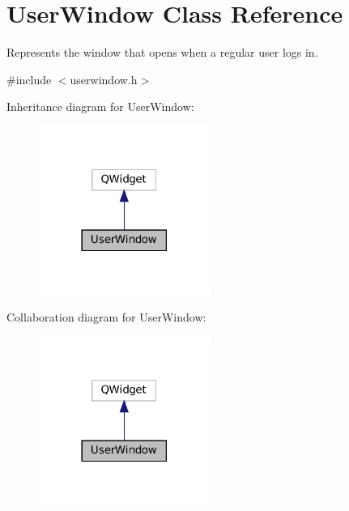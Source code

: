 \hypertarget{classUserWindow}{}\section{User\+Window Class Reference}
\label{classUserWindow}


Represents the window that opens when a regular user logs in.  




{\ttfamily \#include $<$userwindow.\+h$>$}



Inheritance diagram for User\+Window\+:\nopagebreak
\begin{figure}[H]
\begin{center}
\leavevmode
\includegraphics[width=158pt]{classUserWindow__inherit__graph}
\end{center}
\end{figure}


Collaboration diagram for User\+Window\+:\nopagebreak
\begin{figure}[H]
\begin{center}
\leavevmode
\includegraphics[width=158pt]{classUserWindow__coll__graph}
\end{center}
\end{figure}
